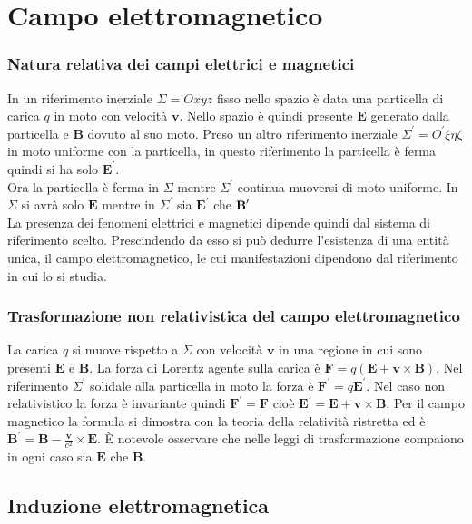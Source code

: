 \documentclass[11pt,a4paper]{article}
\begin{document}
	\section{Campo elettromagnetico}
\subsubsection{Natura relativa dei campi elettrici e magnetici}
In un riferimento inerziale $\Sigma= Oxyz$ fisso nello spazio è data una particella di carica $q$ in moto con velocità $\mathbf v$. Nello spazio è quindi presente $\mathbf E$ generato dalla particella e $\mathbf B$ dovuto al suo moto. Preso un altro riferimento inerziale $\Sigma^\prime = O^\prime\xi\eta\zeta$ in moto uniforme con la particella, in questo riferimento la particella è ferma quindi si ha solo $\mathbf E^\prime$.\\
Ora la particella è ferma in $\Sigma$ mentre $\Sigma^\prime$ continua muoversi di moto uniforme. In $\Sigma$ si avrà solo $\mathbf E$ mentre in $\Sigma^\prime$ sia $\mathbf E^\prime$ che $\textbf B^\prime$\\
La presenza dei fenomeni elettrici e magnetici dipende quindi dal sistema di riferimento scelto. Prescindendo da esso si può dedurre l'esistenza di una entità unica, il campo elettromagnetico, le cui manifestazioni dipendono dal riferimento in cui lo si studia.

\subsubsection{Trasformazione non relativistica del campo elettromagnetico}
La carica $q$ si muove rispetto a $\Sigma$ con velocità $\mathbf v$ in una regione in cui sono presenti $\mathbf E$ e $\mathbf B$. La forza di Lorentz agente sulla carica è $\mathbf F = q(\mathbf E + \mathbf v \times \mathbf B)$. Nel riferimento $\Sigma^\prime$ solidale alla particella in moto la forza è $\mathbf F^\prime = q\mathbf E^\prime$. Nel caso non relativistico la forza è invariante quindi $\mathbf F^\prime = \mathbf F$ cioè $\mathbf E^\prime = \mathbf E + \mathbf v \times \mathbf B$. Per il campo magnetico la formula si dimostra con la teoria della relatività ristretta ed è $\mathbf B^\prime = \mathbf  B - \frac{\mathbf v}{c^2} \times \mathbf E$. È notevole osservare che nelle leggi di trasformazione compaiono in ogni caso sia $\mathbf E$ che $\mathbf B$.

\subsection{Induzione elettromagnetica}
\end{document}
